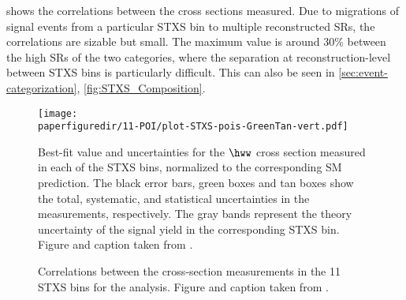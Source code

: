  shows the correlations between the cross sections measured. 
Due to migrations of signal events from a particular STXS bin to multiple reconstructed SRs, the correlations are sizable but small. The maximum value is around 30\% between the high \pTH SRs of the two \TwoJet categories, where the separation at reconstruction-level between STXS bins is particularly difficult. This can also be seen in \cref{sec:event-categorization}, \cref{fig:STXS_Composition}. 
\begin{figure}[htb]
  \centering
  \texttt{[image: \\paperfiguredir/11-POI/plot-STXS-pois-GreenTan-vert.pdf]}
  \caption{
    Best-fit value and uncertainties for the $\hww$ cross section measured in each of the STXS bins, normalized to the corresponding SM prediction.
    The black error bars, green boxes and tan boxes show the total, systematic, and statistical uncertainties in the measurements, respectively.
    The gray bands represent the theory uncertainty of the signal yield in the corresponding STXS bin.
    Figure and caption taken from .
    \label{fig:11-POI_measurement}
  }
\end{figure}

\begin{figure}[htb]
  \centering
  \scalebox{0.8}{
    
  }
  \caption{
    Correlations between the cross-section measurements in the 11 STXS bins for the \HWW analysis.
    Figure and caption taken from .
    \label{fig:STXS-correlation}
  }
\end{figure}

